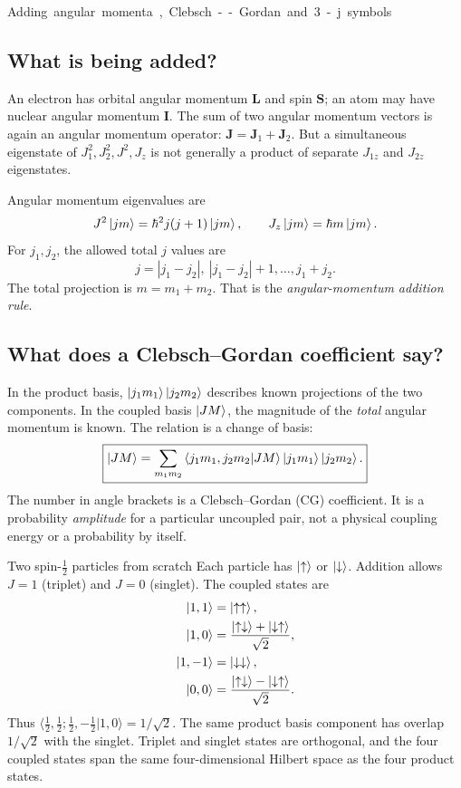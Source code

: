 \unit{Adding angular momenta, Clebsch--Gordan and 3-j symbols}
\subsection{What is being added?}
An electron has orbital angular momentum
\(\mathbf L\) and spin \(\mathbf S\);
an atom may have nuclear angular momentum
\(\mathbf I\). The sum of two angular
momentum vectors is again an angular
momentum operator:
\(\mathbf J=\mathbf J_1+\mathbf J_2\).
But a simultaneous eigenstate of
\(J_1^2,J_2^2,J^2,J_z\) is not generally
a product of separate \(J_{1z}\) and
\(J_{2z}\) eigenstates.

Angular momentum eigenvalues are
\[
J^2\left\lvert jm\right\rangle=\hbar^2j(j+1)\left\lvert jm\right\rangle,
\qquad J_z\left\lvert jm\right\rangle=\hbar m\left\lvert jm\right\rangle.
\]
For \(j_1,j_2\), the allowed total \(j\) values are
\[
\boxed{j=|j_1-j_2|,\ |j_1-j_2|+1,\ldots,j_1+j_2.}
\]
The total projection is \(m=m_1+m_2\).
That is the \emph{angular-momentum addition rule}.

\subsection{What does a Clebsch--Gordan coefficient say?}
In the product basis,
\(\left\lvert j_1m_1\right\rangle\left\lvert j_2m_2\right\rangle\) describes
known projections of the two components.
In the coupled basis \(\left\lvert JM\right\rangle\),
the magnitude of the \emph{total}
angular momentum is known.
The relation is a change of basis:
\[
\boxed{\left\lvert JM\right\rangle=
\sum_{m_1m_2}
\left\langle j_1m_1,j_2m_2\middle\vert JM\right\rangle
\left\lvert j_1m_1\right\rangle\left\lvert j_2m_2\right\rangle.}
\]
The number in angle brackets is a
Clebsch--Gordan (CG) coefficient.
It is a probability \emph{amplitude}
for a particular uncoupled pair, not
a physical coupling energy or a probability by itself.

\begin{worked}{Two spin-\(\tfrac12\) particles from scratch}
Each particle has \(\left\lvert \uparrow\right\rangle\) or
\(\left\lvert \downarrow\right\rangle\). Addition allows
\(J=1\) (triplet) and \(J=0\) (singlet).
The coupled states are
\[
\begin{aligned}
\left\lvert 1,1\right\rangle&=\left\lvert \uparrow\uparrow\right\rangle,\\
\left\lvert 1,0\right\rangle&=\frac{\left\lvert \uparrow\downarrow\right\rangle
+\left\lvert \downarrow\uparrow\right\rangle}{\sqrt2},\\
\left\lvert 1,-1\right\rangle&=\left\lvert \downarrow\downarrow\right\rangle,\\
\left\lvert 0,0\right\rangle&=\frac{\left\lvert \uparrow\downarrow\right\rangle
-\left\lvert \downarrow\uparrow\right\rangle}{\sqrt2}.
\end{aligned}
\]
Thus
\(\langle\tfrac12,\tfrac12;
\tfrac12,-\tfrac12|1,0\rangle=1/\sqrt2\).
The same product basis component
has overlap \(1/\sqrt2\) with the singlet.
Triplet and singlet states are
orthogonal, and the four coupled
states span the same four-dimensional
Hilbert space as the four product states.
\end{worked}

